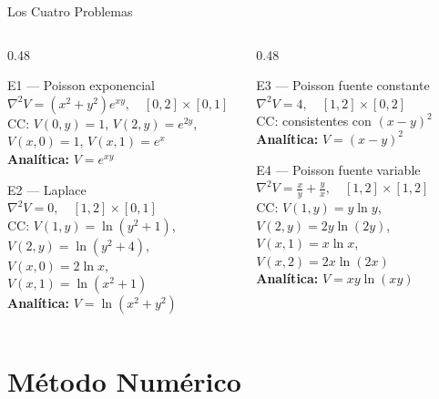 \documentclass[aspectratio=169, 11pt]{beamer}
\begin{document}
\begin{frame}{Los Cuatro Problemas}
  \small
  \begin{columns}[T]
    \begin{column}{0.48\textwidth}
      \begin{block}{E1 — Poisson exponencial}
        $\nabla^2 V = (x^2+y^2)e^{xy},\quad [0,2]\times[0,1]$\\[0.15cm]
        CC: $V(0,y)=1$,\; $V(2,y)=e^{2y}$,\; $V(x,0)=1$,\; $V(x,1)=e^x$\\[0.15cm]
        \textbf{Analítica:} $V = e^{xy}$
      \end{block}
      \vspace{0.2cm}
      \begin{block}{E2 — Laplace}
        $\nabla^2 V = 0,\quad [1,2]\times[0,1]$\\[0.15cm]
        CC: $V(1,y)=\ln(y^2+1)$,\; $V(2,y)=\ln(y^2+4)$,\\
        \hphantom{CC: }$V(x,0)=2\ln x$,\; $V(x,1)=\ln(x^2+1)$\\[0.15cm]
        \textbf{Analítica:} $V = \ln(x^2+y^2)$
      \end{block}
    \end{column}
    \begin{column}{0.48\textwidth}
      \begin{block}{E3 — Poisson fuente constante}
        $\nabla^2 V = 4,\quad [1,2]\times[0,2]$\\[0.15cm]
        CC: consistentes con $(x-y)^2$\\[0.15cm]
        \textbf{Analítica:} $V = (x-y)^2$
      \end{block}
      \vspace{0.2cm}
      \begin{block}{E4 — Poisson fuente variable}
        $\nabla^2 V = \tfrac{x}{y}+\tfrac{y}{x},\quad [1,2]\times[1,2]$\\[0.15cm]
        CC: $V(1,y)=y\ln y$,\; $V(2,y)=2y\ln(2y)$,\\
        \hphantom{CC: }$V(x,1)=x\ln x$,\; $V(x,2)=2x\ln(2x)$\\[0.15cm]
        \textbf{Analítica:} $V = xy\ln(xy)$
      \end{block}
    \end{column}
  \end{columns}
\end{frame}

\section{Método Numérico}
\end{document}
